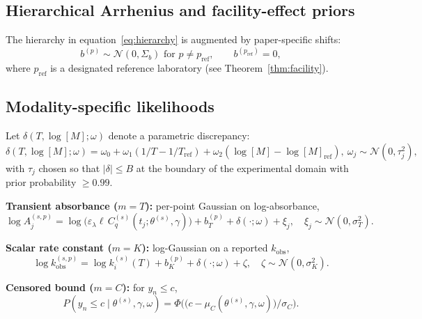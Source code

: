 \documentclass[11pt]{article}
\theoremstyle{definition}
\theoremstyle{remark}
\begin{document}
\subsection{Hierarchical Arrhenius and facility-effect priors}

The hierarchy in equation~\eqref{eq:hierarchy} is augmented by paper-specific shifts:
\begin{equation}\label{eq:facility}
  b^{(p)}\sim\mathcal N(0,\Sigma_b)\text{ for } p\neq p_{\mathrm{ref}},\qquad
  b^{(p_{\mathrm{ref}})} = 0,
\end{equation}
where $p_{\mathrm{ref}}$ is a designated reference laboratory (see Theorem~\ref{thm:facility}).

\subsection{Modality-specific likelihoods}\label{sec:likelihoods}

Let $\delta(T,\log[M];\omega)$ denote a parametric discrepancy:
\begin{equation}\label{eq:disc}
  \delta(T,\log[M];\omega) = \omega_0 + \omega_1(1/T - 1/T_{\mathrm{ref}}) + \omega_2(\log[M]-\log[M]_{\mathrm{ref}}),\
  \omega_j\sim\mathcal N(0,\tau_j^2),
\end{equation}
with $\tau_j$ chosen so that $|\delta|\le B$ at the boundary of the experimental domain
with prior probability $\ge 0.99$.

\textbf{Transient absorbance ($m=T$):} per-point Gaussian on log-absorbance,
\begin{equation}\label{eq:lik_T}
  \log A^{(s,p)}_j = \log\bigl(\varepsilon_\lambda\ell\, C^{(s)}_q(t_j;\theta^{(s)},\gamma)\bigr)
  + b^{(p)}_T + \delta(\cdot;\omega) + \xi_j,\quad \xi_j\sim\mathcal N(0,\sigma_T^2).
\end{equation}

\textbf{Scalar rate constant ($m=K$):} log-Gaussian on a reported $k_{\mathrm{obs}}$,
\begin{equation}\label{eq:lik_K}
  \log k^{(s,p)}_{\mathrm{obs}} = \log k_i^{(s)}(T) + b^{(p)}_K + \delta(\cdot;\omega) + \zeta,\quad
  \zeta\sim\mathcal N(0,\sigma_K^2).
\end{equation}

\textbf{Censored bound ($m=C$):} for $y_n\le c$,
\begin{equation}\label{eq:lik_C}
  P(y_n\le c\mid\theta^{(s)},\gamma,\omega) = \Phi\bigl(\bigl(c-\mu_C(\theta^{(s)},\gamma,\omega)\bigr)/\sigma_C\bigr).
\end{equation}
\end{document}
